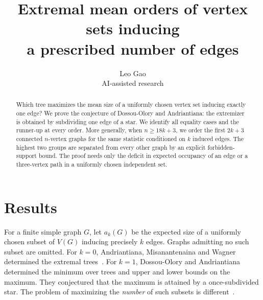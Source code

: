 \documentclass[11pt,a4paper]{article}
\title{Extremal mean orders of vertex sets inducing\texorpdfstring{\\}{ }a prescribed number of edges}
\author{Leo Gao\\\small AI-assisted research}\date{}
\newcommand{\av}{a}
\begin{document}
\maketitle
\begin{abstract}
Which tree maximizes the mean size of a uniformly chosen vertex set inducing exactly one edge? We prove the conjecture of Dossou-Olory and Andriantiana: the extremizer is obtained by subdividing one edge of a star. We identify all equality cases and the runner-up at every order. More generally, when $n\ge18k+3$, we order the first $2k+3$ connected $n$-vertex graphs for the same statistic conditioned on $k$ induced edges. The highest two groups are separated from every other graph by an explicit forbidden-support bound. The proof needs only the deficit in expected occupancy of an edge or a three-vertex path in a uniformly chosen independent set.
\end{abstract}
\section{Results}
For a finite simple graph $G$, let $\av_k(G)$ be the expected size of a uniformly chosen subset of $V(G)$ inducing precisely $k$ edges. Graphs admitting no such subset are omitted. For $k=0$, Andriantiana, Misanantenaina and Wagner determined the extremal trees~\cite{AMW}. For $k=1$, Dossou-Olory and Andriantiana~\cite{DA} determined the minimum over trees and upper and lower bounds on the maximum. They conjectured that the maximum is attained by a once-subdivided star. The problem of maximizing the \emph{number} of such subsets is different~\cite{AS}.
  
\end{document}
